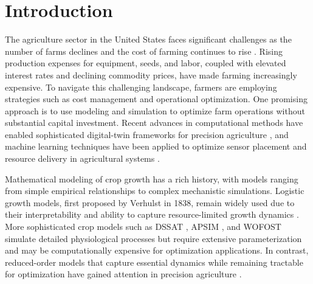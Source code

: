 \documentclass[pdflatex,sn-mathphys-num]{sn-jnl}
\begin{document}
\maketitle

\section{Introduction}\label{sec:intro}

The agriculture sector in the United States faces significant challenges as the number of farms declines and the cost of farming continues to rise \cite{usda-farm-income}. Rising production expenses for equipment, seeds, and labor, coupled with elevated interest rates and declining commodity prices, have made farming increasingly expensive. To navigate this challenging landscape, farmers are employing strategies such as cost management and operational optimization. One promising approach is to use modeling and simulation to optimize farm operations without substantial capital investment. Recent advances in computational methods have enabled sophisticated digital-twin frameworks for precision agriculture \cite{zohdi2024digitaltwin,mengi2023indoorfarming}, and machine learning techniques have been applied to optimize sensor placement and resource delivery in agricultural systems \cite{goodrich2022sensors,tagkopoulos2024aifs}.

Mathematical modeling of crop growth has a rich history, with models ranging from simple empirical relationships to complex mechanistic simulations. Logistic growth models, first proposed by Verhulst in 1838, remain widely used due to their interpretability and ability to capture resource-limited growth dynamics \cite{verhulst1838}. More sophisticated crop models such as DSSAT \cite{jones2003dssat}, APSIM \cite{holzworth2014apsim}, and WOFOST \cite{wofost} simulate detailed physiological processes but require extensive parameterization and may be computationally expensive for optimization applications. In contrast, reduced-order models that capture essential dynamics while remaining tractable for optimization have gained attention in precision agriculture \cite{precision-ag-review}.
\end{document}
